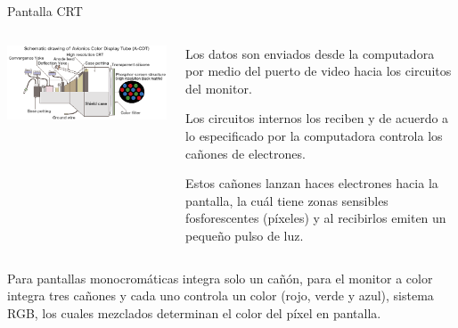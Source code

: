 \begin{frame}

  \begin{block}{Pantalla \ac{CRT}}
    \begin{columns}[T]

      \begin{column}[T]{0.6\textwidth}
        \includegraphics[width=\linewidth]{imagenes/1.4.pantalla.electronica/CRT.gif}
      \end{column}

      \begin{column}[T]{0.4\textwidth}
	
        \begin{itemize}
{\footnotesize
        \item Los datos son enviados desde la computadora por medio
          del puerto de video hacia los circuitos del monitor.

        \item           Los circuitos internos los reciben y de acuerdo a lo
          especificado por la computadora controla los ca\~nones de
          electrones.

        \item           Estos ca\~nones lanzan haces electrones hacia la pantalla, la
          cu\'al tiene zonas sensibles fosforescentes (p\'ixeles) y al
          recibirlos emiten un peque\~no pulso de luz.

}
        \end{itemize}


      \end{column}
    \end{columns}

    \begin{itemize}
 {\footnotesize 
        \item           Para pantallas monocrom\'aticas integra solo un ca\~n\'on, para el
          monitor a color integra tres ca\~nones y cada uno controla un
          color (rojo, verde y azul), sistema RGB, los cuales
          mezclados determinan el color del p\'ixel en pantalla.

}
\end{itemize}
\end{block}
\end{frame}
